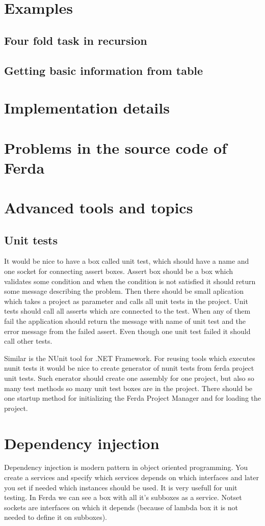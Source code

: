 \documentclass{article}
\begin{document}
\section{Examples}
\subsection{Four fold task in recursion}
\subsection{Getting basic information from table}
\section{Implementation details}
\section{Problems in the source code of Ferda}
\section{Advanced tools and topics}
\subsection{Unit tests}
It would be nice to have a box called unit test, which should have a name and one socket for connecting assert boxes. Assert box should be a box which validates some condition and when the condition is not satisfied it should return some message describing the problem. Then there should be small aplication which takes a project as parameter and calls all unit tests in the project. Unit tests should call all asserts which are connected to the test. When any of them fail the application should return the message with name of unit test and the error message from the failed assert. Even though one unit test failed it should call other tests.

Similar is the NUnit tool for .NET Framework. For reusing tools which executes nunit tests it would be nice to create generator of nunit tests from ferda project unit tests. Such enerator should create one assembly for one project, but also so many test methods so many unit test boxes are in the project. There should be one startup method for initializing the Ferda Project Manager and for loading the project. 

\section{Dependency injection}
Dependency injection is modern pattern in object oriented programming. You create a services and specify which services depends on which interfaces and later you set if needed which instances should be used. It is very usefull for unit testing. In Ferda we can see a box with all it's subboxes as a service. Notset sockets are interfaces on which it depends (because of lambda box it is not needed to define it on subboxes).
\end{document}
